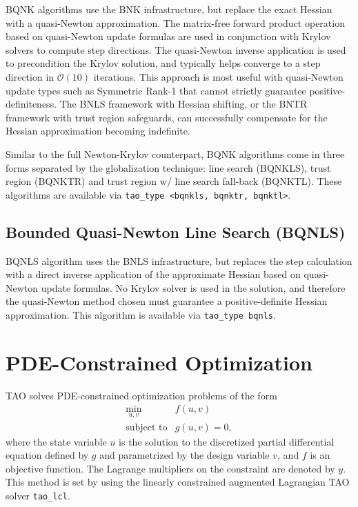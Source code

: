 BQNK algorithms use the BNK infrastructure, but replace the exact Hessian with a quasi-Newton 
approximation. The matrix-free forward product operation based on quasi-Newton update formulas 
are used in conjunction with Krylov solvers to compute step directions. The quasi-Newton inverse 
application is used to precondition the Krylov solution, and typically helps converge to a step 
direction in $\mathcal{O}(10)$ iterations. This approach is most useful with quasi-Newton update 
types such as Symmetric Rank-1 that cannot strictly guarantee positive-definiteness. The BNLS 
framework with Hessian shifting, or the BNTR framework with trust region safeguards, can 
successfully compensate for the Hessian approximation becoming indefinite.

Similar to the full Newton-Krylov counterpart, BQNK algorithms come in three forms separated by 
the globalization technique: line search (BQNKLS), trust region (BQNKTR) and trust region w/ line 
search fall-back (BQNKTL). These algorithms are available via {\tt tao\_type <bqnkls, bqnktr, bqnktl>}.

\subsection{Bounded Quasi-Newton Line Search (BQNLS)}\label{sec:bqnls}

BQNLS algorithm uses the BNLS infrastructure, but replaces the step calculation with a direct 
inverse application of the approximate Hessian based on quasi-Newton update formulas. No Krylov 
solver is used in the solution, and therefore the quasi-Newton method chosen must guarantee 
a positive-definite Hessian approximation. This algorithm is available via {\tt tao\_type bqnls}.

\section{PDE-Constrained Optimization}
\label{sec:lcl}

TAO solves PDE-constrained optimization problems of the form
\[
\begin{array}{ll}
\displaystyle \min_{u,v} & f(u,v) \\
\mbox{subject to} & g(u,v) = 0,
\end{array}
\]
where the state variable $u$ is the solution to the discretized
partial differential equation defined by $g$ and parametrized by 
the design variable $v$, and $f$ is an objective function.  The 
Lagrange multipliers on the constraint are denoted by $y$.
This method is set by using the linearly constrained augmented
Lagrangian TAO solver {\tt tao\_lcl}.

